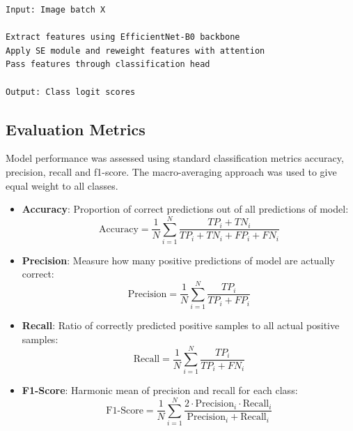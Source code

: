 \documentclass[conference]{IEEEtran}
\begin{document}
\begin{lstlisting}[style=ieeelisting, frame=none,
caption={Forward Pass of PierceStageNet},
label={lst:fpass}, basicstyle=\ttfamily\footnotesize]
Input: Image batch X

Extract features using EfficientNet-B0 backbone
Apply SE module and reweight features with attention
Pass features through classification head

Output: Class logit scores
\end{lstlisting}

\subsection{Evaluation Metrics}
Model performance was assessed using standard classification metrics accuracy, precision, recall and f1-score. The macro-averaging approach was used to give equal weight to all classes.

\begin{itemize}
	\item \textbf{Accuracy}: Proportion of correct predictions out of all predictions of model:
	      \begin{equation}
		      \text{Accuracy} = \frac{1}{N} \sum_{i=1}^{N} \frac{TP_i + TN_i}{TP_i + TN_i + FP_i + FN_i}
	      \end{equation}

	\item \textbf{Precision}: Measure how many positive predictions of model are actually correct:
	      \begin{equation}
		      \text{Precision} = \frac{1}{N} \sum_{i=1}^{N} \frac{TP_i}{TP_i + FP_i}
	      \end{equation}

	\item \textbf{Recall}: Ratio of correctly predicted positive samples to all actual positive samples:
	      \begin{equation}
		      \text{Recall} = \frac{1}{N} \sum_{i=1}^{N} \frac{TP_i}{TP_i + FN_i}
	      \end{equation}

	\item \textbf{F1-Score}: Harmonic mean of precision and recall for each class:
	      \begin{equation}
		      \text{F1-Score} = \frac{1}{N} \sum_{i=1}^{N} \frac{2 \cdot \text{Precision}_i \cdot \text{Recall}_i}{\text{Precision}_i + \text{Recall}_i}
	      \end{equation}
\end{itemize}
\end{document}
